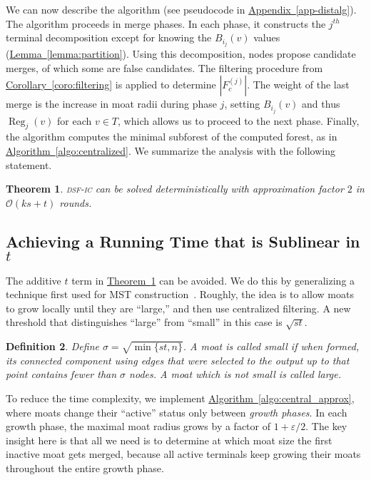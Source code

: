 \documentclass[letterpaper,11pt]{article}
\newtheorem{theorem}{Theorem}[section]
\newtheorem{definition}[theorem]{Definition}
\newcommand{\namedref}[2]{\hyperref[#2]{#1~\ref*{#2}}}
\newcommand{\theoremref}[1]{\namedref{Theorem}{#1}}
\newcommand{\lemmaref}[1]{\namedref{Lemma}{#1}}
\newcommand{\corollaryref}[1]{\namedref{Corollary}{#1}}
\newcommand{\appref}[1]{\namedref{Appendix}{#1}}
\newcommand{\algref}[1]{\namedref{Algorithm}{#1}}
\newcommand{\BO}{\mathcal{O}}
\DeclareMathOperator{\reg}{Reg}
\newcommand{\sfic}{\textsc{dsf-ic}\xspace}
\begin{document}
We can now describe the algorithm (see pseudocode in
\appref{app-distalg}). The algorithm
proceeds in merge phases. In each phase, it constructs the
$j^{th}$ terminal decomposition except for knowing the $B_{i_j}(v)$ values
(\lemmaref{lemma:partition}). Using this decomposition, nodes propose
candidate merges, of which some are false candidates. The filtering
procedure from \corollaryref{coro:filtering} is applied to determine
$|F_c^{(j)}|$. The weight of the last merge
is the increase in moat radii during phase $j$, setting
$B_{i_j}(v)$ and thus $\reg_j(v)$ for each $v\in T$, which allows us
to proceed to the next phase. Finally, the algorithm computes
the minimal subforest of the computed forest,  as in 
\algref{algo:centralized}. We summarize the analysis with the
following statement.


\begin{theorem}\label{theorem:2_distributed}
\sfic can be solved deterministically with approximation factor $2$ in
$\BO(ks+t)$ rounds.
\end{theorem}

\subsection{Achieving a Running Time that is Sublinear in
\texorpdfstring{$t$}{t}}
\label{sec:sublinear}

The additive $t$ term in \theoremref{theorem:2_distributed} can be
avoided. We do this by generalizing a technique first used for MST 
construction~\cite{GarayKP-98,KuttenP-98}. 
Roughly, the idea is to allow moats to grow locally until
they are ``large,'' and then use centralized filtering. A new
threshold that distinguishes ``large'' from ``small'' in this case is $\sqrt{st}$.




\begin{definition}Define $\sigma=\sqrt{\min\{st,n\}}$. A moat is called \emph{small} if when
formed, its connected component using edges that were selected to the output up
to that point contains fewer than $\sigma$ nodes. A moat which is not small
is called \emph{large}.
\end{definition}



To reduce the time complexity, we implement
\algref{algo:central_approx}, where moats change
their ``active'' status only between \emph{growth phases}. In each growth phase,
the maximal moat radius grows by a factor of $1+{\varepsilon/2}$. The key insight here is that all we need is to determine at which
moat size the first inactive moat gets merged, because all active terminals
keep growing their moats throughout the
entire growth phase. 
\end{document}
